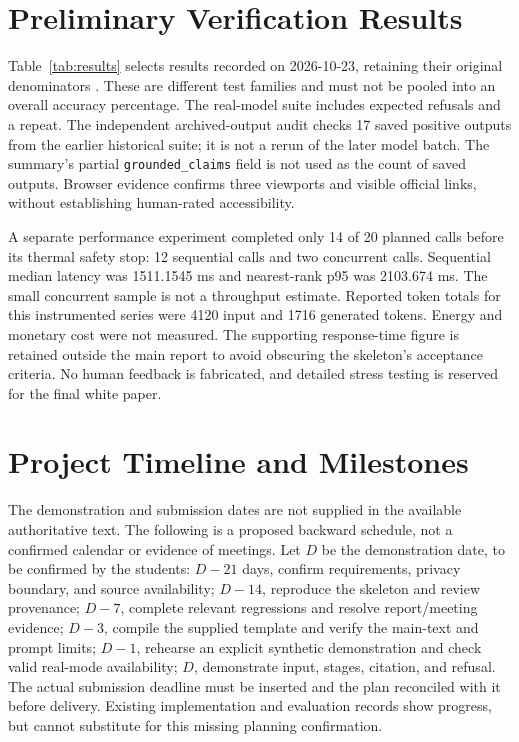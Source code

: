 \documentclass{article}
\begin{document}
\section{Preliminary Verification Results}
Table~\ref{tab:results} selects results recorded on 2026-10-23, retaining their original denominators \cite{evidence,results}. These are different test families and must not be pooled into an overall accuracy percentage. The real-model suite includes expected refusals and a repeat. The independent archived-output audit checks 17 saved positive outputs from the earlier historical suite; it is not a rerun of the later model batch. The summary's partial \texttt{grounded\_claims} field is not used as the count of saved outputs. Browser evidence confirms three viewports and visible official links, without establishing human-rated accessibility.
\begin{table}[ht]
\centering\small

\caption{Selected preliminary verification, 2026-10-23. Exact-source support is not semantic factual accuracy. Source files and limitations are supplied in the bilingual CSV/Markdown tables.}
\label{tab:results}
\end{table}
A separate performance experiment completed only 14 of 20 planned calls before its thermal safety stop: 12 sequential calls and two concurrent calls. Sequential median latency was 1511.1545 ms and nearest-rank p95 was 2103.674 ms. The small concurrent sample is not a throughput estimate. Reported token totals for this instrumented series were 4120 input and 1716 generated tokens. Energy and monetary cost were not measured. The supporting response-time figure is retained outside the main report to avoid obscuring the skeleton's acceptance criteria. No human feedback is fabricated, and detailed stress testing is reserved for the final white paper.

\section{Project Timeline and Milestones}
The demonstration and submission dates are not supplied in the available authoritative text. The following is a proposed backward schedule, not a confirmed calendar or evidence of meetings. Let $D$ be the demonstration date, to be confirmed by the students: $D-21$ days, confirm requirements, privacy boundary, and source availability; $D-14$, reproduce the skeleton and review provenance; $D-7$, complete relevant regressions and resolve report/meeting evidence; $D-3$, compile the supplied template and verify the main-text and prompt limits; $D-1$, rehearse an explicit synthetic demonstration and check valid real-mode availability; $D$, demonstrate input, stages, citation, and refusal. The actual submission deadline must be inserted and the plan reconciled with it before delivery. Existing implementation and evaluation records show progress, but cannot substitute for this missing planning confirmation.
\end{document}
